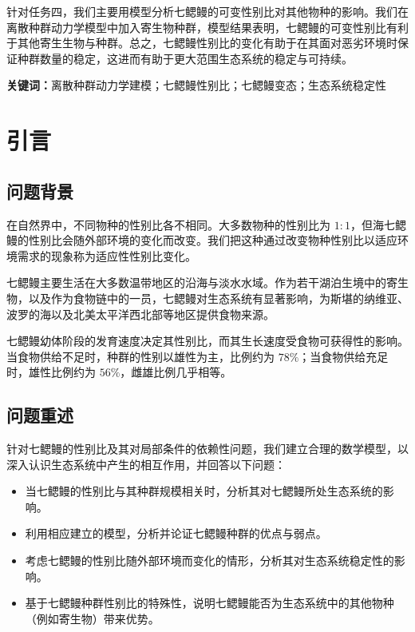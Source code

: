\documentclass[11pt,a4paper]{ctexart}
\begin{document}
针对任务四，我们主要用模型分析七鳃鳗的可变性别比对其他物种的影响。我们在离散种群动力学模型中加入寄生物种群，模型结果表明，七鳃鳗的可变性别比有利于其他寄生生物与种群。总之，七鳃鳗性别比的变化有助于在其面对恶劣环境时保证种群数量的稳定，这进而有助于更大范围生态系统的稳定与可持续。

\vspace{6pt}
\noindent\textbf{关键词：}离散种群动力学建模；七鳃鳗性别比；七鳃鳗变态；生态系统稳定性

\newpage
\pagestyle{fancy}

\section{引言}

\subsection{问题背景}

在自然界中，不同物种的性别比各不相同。大多数物种的性别比为 $1:1$，但海七鳃鳗的性别比会随外部环境的变化而改变。我们把这种通过改变物种性别比以适应环境需求的现象称为适应性性别比变化。

七鳃鳗主要生活在大多数温带地区的沿海与淡水水域。作为若干湖泊生境中的寄生物，以及作为食物链中的一员，七鳃鳗对生态系统有显著影响，为斯堪的纳维亚、波罗的海以及北美太平洋西北部等地区提供食物来源。

七鳃鳗幼体阶段的发育速度决定其性别比，而其生长速度受食物可获得性的影响。当食物供给不足时，种群的性别以雄性为主，比例约为 $78\%$；当食物供给充足时，雄性比例约为 $56\%$，雌雄比例几乎相等。

\subsection{问题重述}

针对七鳃鳗的性别比及其对局部条件的依赖性问题，我们建立合理的数学模型，以深入认识生态系统中产生的相互作用，并回答以下问题：

\begin{itemize}
\item 当七鳃鳗的性别比与其种群规模相关时，分析其对七鳃鳗所处生态系统的影响。
\item 利用相应建立的模型，分析并论证七鳃鳗种群的优点与弱点。
\item 考虑七鳃鳗的性别比随外部环境而变化的情形，分析其对生态系统稳定性的影响。
\item 基于七鳃鳗种群性别比的特殊性，说明七鳃鳗能否为生态系统中的其他物种（例如寄生物）带来优势。
\end{itemize}
\end{document}
